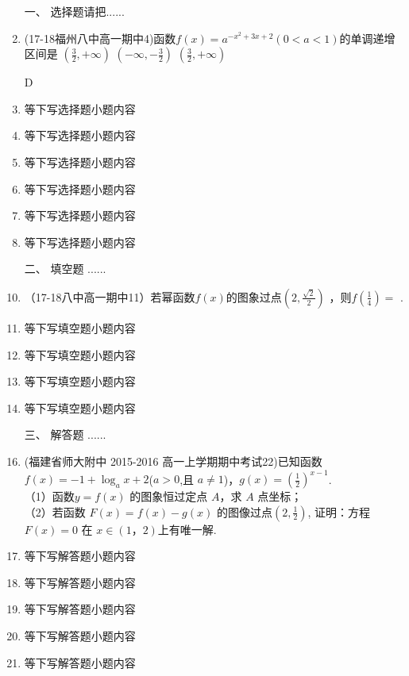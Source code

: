 \begin{enumerate} 
        \item[一、] 选择题请把......
        \item (17-18福州八中高一期中4)函数$f(x)=a^{-x^2+3x+2}(0<a<1)$的单调递增区间是\xz
        {$(\frac32,+\infty)$}
        {$(-\infty,-\frac32)$}
        {$(\frac32,+\infty)$}
        \begin{answer}
            D
        \end{answer}

        
        \item 等下写选择题小题内容 
        \item 等下写选择题小题内容 
        \item 等下写选择题小题内容 
        \item 等下写选择题小题内容 
        \item 等下写选择题小题内容 
        \item 等下写选择题小题内容 

        \item[二、] 填空题  ......
        \item （17-18八中高一期中11）若幂函数$f(x)$的图象过点$(2,\frac{\sqrt2}2)$ ，则$f(\frac14 )= $ \tk.
        \item 等下写填空题小题内容 
        \item 等下写填空题小题内容 
        \item 等下写填空题小题内容 
        \item 等下写填空题小题内容 

        \item[三、] 解答题  ......
        \item (福建省师大附中 2015-2016 高一上学期期中考试22)已知函数$f(x)=-1+\log_a{x+2}$($a>0$,且 $a \neq1$)，$g(x)=(\frac12)^{x-1}$.\\
（1）函数$ y= f (x )$ 的图象恒过定点 $A$，求 $A$ 点坐标；\\
（2）若函数 $F ( x )= f ( x )- g ( x )$ 的图像过点$(2,\frac12)$, 证明：方程 $F ( x )= 0$ 在 $x\in(1，2)$上有唯一解. 


        \item 等下写解答题小题内容 
        \item 等下写解答题小题内容 
        \item 等下写解答题小题内容 
        \item 等下写解答题小题内容 
        \item 等下写解答题小题内容 
\end{enumerate} 

